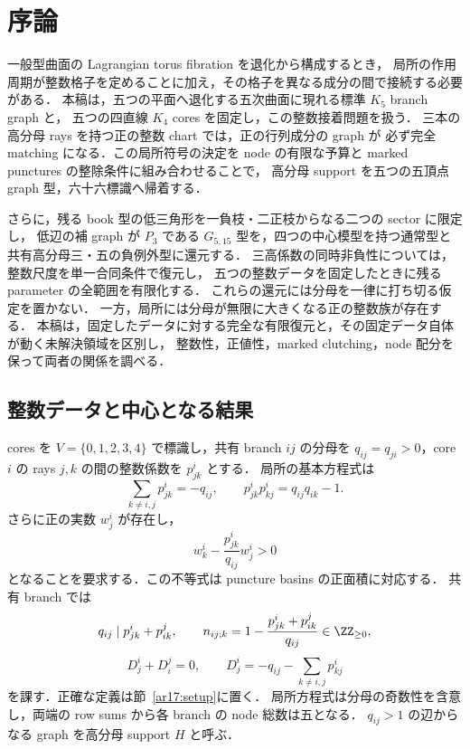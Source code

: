 \section{序論}
\label{ar17:introduction}

一般型曲面の Lagrangian torus fibration を退化から構成するとき，
局所の作用周期が整数格子を定めることに加え，その格子を異なる成分の間で接続する必要がある．
本稿は，五つの平面へ退化する五次曲面に現れる標準 $K_5$ branch graph と，
五つの四直線 $K_4$ cores を固定し，この整数接着問題を扱う．
三本の高分母 rays を持つ正の整数 chart では，正の行列成分の graph が
必ず完全 matching になる．この局所符号の決定を node の有限な予算と
marked punctures の整除条件に組み合わせることで，
高分母 support を五つの五頂点 graph 型，六十六標識へ帰着する．

さらに，残る book 型の低三角形を一負枝・二正枝からなる二つの sector に限定し，
低辺の補 graph が $P_3$ である $G_{5,15}$ 型を，四つの中心模型を持つ通常型と
共有高分母三・五の負例外型に還元する．
三高係数の同時非負性については，整数尺度を単一合同条件で復元し，
五つの整数データを固定したときに残る parameter の全範囲を有限化する．
これらの還元には分母を一律に打ち切る仮定を置かない．
一方，局所には分母が無限に大きくなる正の整数族が存在する．
本稿は，固定したデータに対する完全な有限復元と，その固定データ自体が動く未解決領域を区別し，
整数性，正値性，marked clutching，node 配分を保って両者の関係を調べる．

\subsection{整数データと中心となる結果}

cores を $V=\{0,1,2,3,4\}$ で標識し，共有 branch $ij$ の分母を
$q_{ij}=q_{ji}>0$，core $i$ の rays $j,k$ の間の整数係数を $p^i_{jk}$ とする．
局所の基本方程式は
\[
 \sum_{k\ne i,j}p^i_{jk}=-q_{ij},\qquad
 p^i_{jk}p^i_{kj}=q_{ij}q_{ik}-1.
\]
さらに正の実数 $w^i_j$ が存在し，
\[
 w^i_k-\frac{p^i_{jk}}{q_{ij}}w^i_j>0
\]
となることを要求する．この不等式は puncture basins の正面積に対応する．
共有 branch では
\[
 q_{ij}\mid p^i_{jk}+p^j_{ik},\qquad
 n_{ij;k}=1-\frac{p^i_{jk}+p^j_{ik}}{q_{ij}}\in\ZZ_{\ge0},
\]
\[
 D^i_j+D^j_i=0,\qquad
 D^i_j=-q_{ij}-\sum_{k\ne i,j}p^i_{kj}
\]
を課す．正確な定義は節~\ref{ar17:setup}に置く．
局所方程式は分母の奇数性を含意し，両端の row sums から各 branch の node 総数は五となる．
$q_{ij}>1$ の辺からなる graph を高分母 support $H$ と呼ぶ．

